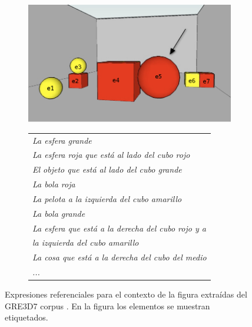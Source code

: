 \begin{figure}[h]
\begin{subfigure}{.5\textwidth}
\centering
\includegraphics[width=\textwidth]{images/22.jpg}\\[0pt]
\caption{}
\label{GRE3D7-stimulus}
\vspace*{.1cm}
\end{subfigure}
\hspace*{0cm}
\begin{subfigure}{.5\textwidth}
\centering
\begin{tabular}{l}
 {\it La esfera grande}\\
 {\it La esfera roja que est\'a al lado del cubo rojo} \\
 {\it El objeto que est\'a al lado del cubo grande}\\
 {\it La bola roja}\\
 {\it La pelota a la izquierda del cubo amarillo}\\
 {\it La bola grande}\\
 {\it La esfera que est\'a a la derecha del cubo rojo y a }\\
 {\it la izquierda del cubo amarillo}\\
 {\it La cosa que est\'a a la derecha del cubo del medio}\\
 {\it ...}
 \end{tabular}
\caption{}
\label{GRE3D7-stimulus-er}
\end{subfigure}
\caption{Expresiones referenciales para el contexto de la figura extra\'idas del GRE3D7 corpus \protect\cite{gre3d7}. En la figura los elementos se muestran etiquetados.}\label{fig2-1}

\end{figure}

